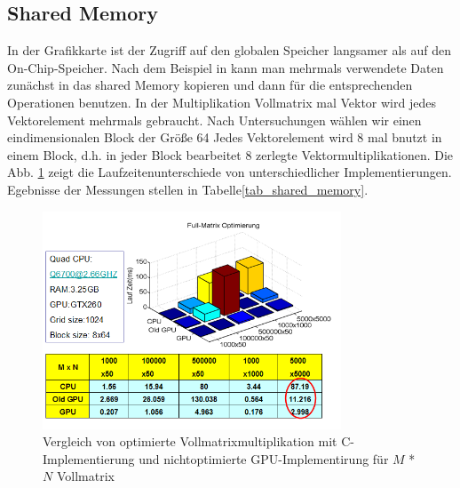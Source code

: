 \subsection{Shared Memory}
In der Grafikkarte ist der Zugriff auf den globalen Speicher langsamer als auf den On-Chip-Speicher.  Nach dem Beispiel in \cite{cudapg}  kann man mehrmals verwendete Daten zunächst in das shared Memory kopieren und dann für die entsprechenden Operationen benutzen.
In der Multiplikation Vollmatrix mal Vektor wird jedes Vektorelement mehrmals gebraucht.
Nach Untersuchungen wählen wir einen eindimensionalen Block der Größe 64
Jedes Vektorelement wird 8 mal bnutzt in einem Block, d.h. in jeder Block bearbeitet
8 zerlegte Vektormultiplikationen. Die Abb. \ref{sharememory}
zeigt die Laufzeitenunterschiede von unterschiedlicher Implementierungen.
Egebnisse der Messungen stellen in Tabelle\ref{tab_shared_memory}.
\begin{figure}[htbp]
\includegraphics[width=3.5in]{../xby/pic/sharememory}
\caption{Vergleich von optimierte Vollmatrixmultiplikation mit C-Implementierung und nichtoptimierte GPU-Implementirung für $M$ * $N$ Vollmatrix}
\label{sharememory}
\end{figure}


